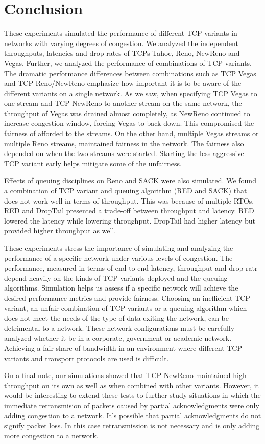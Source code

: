 \section{Conclusion}

These experiments simulated the performance of different TCP variants in networks with varying degrees of congestion. We analyzed the independent throughputs, latencies and drop rates of TCPs Tahoe, Reno, NewReno and Vegas. Further, we analyzed the performance of combinations of TCP variants. The dramatic performance differences between combinations such as TCP Vegas and TCP Reno/NewReno emphasize how important it is to be aware of the different variants on a single network. As we saw, when specifying TCP Vegas to one stream and TCP NewReno to another stream on the same network, the throughput of Vegas was drained almost completely, as NewReno continued to increase congestion window, forcing Vegas to back down. This compromised the fairness of afforded to the streams. On the other hand, multiple Vegas streams or multiple Reno streams, maintained fairness in the network. The fairness also depended on when the two streams were started. Starting the less aggressive TCP variant early helps mitigate some of the unfairness. 

Effects of queuing disciplines on Reno and SACK were also simulated. We found a combination of TCP variant and queuing algorithm (RED and SACK) that does not work well in terms of throughput. This was because of multiple RTOs. RED and DropTail presented a trade-off between throughput and latency. RED lowered the latency while lowering throughput. DropTail had higher latency but provided higher throughput as well. 

These experiments stress the importance of simulating and analyzing the performance of a specific network under various levels of congestion. The performance, measured in terms of end-to-end latency, throughput and drop ratr depend heavily on the kinds of TCP variants deployed and the queuing algorithms. Simulation helps us assess if a specific network will achieve the desired performance metrics and provide fairness. Choosing an inefficient TCP variant, an unfair combination of TCP variants or a queuing algorithm which does not meet the needs of the type of data exiting the network, can be detrimental to a network. These network configurations must be carefully analyzed whether it be in a corporate, government or academic network. Achieving a fair share of bandwidth in an environment where different TCP variants and transport protocols are used is difficult. 

On a final note, our simulations showed that TCP NewReno maintained high throughput on its own as well as when combined with other variants. However, it would be interesting to extend these tests to further study situations in which the immediate retransmision of packets caused by partial acknowledgments were only adding congestion to a network. It's possible that partial acknowledgments do not signify packet loss. In this case retransmission is not necessary and is only adding more congestion to a network.